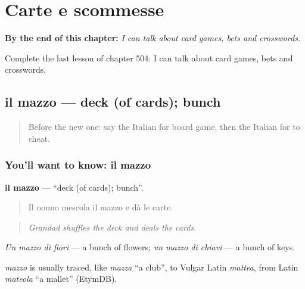 
\chapter{Carte e scommesse}
\label{ch:it-carte-e-scommesse}

\begin{chapteropening}
\textbf{By the end of this chapter:} \emph{I can talk about card games, bets and crosswords.}

Complete the last lesson of chapter 504: I can talk about card games, bets and crosswords.
\end{chapteropening}

\section[il mazzo]{il mazzo — deck (of cards); bunch}

\label{lesson:IT-C504-mazzo}



\begin{quote}
Before the new one: say the Italian for board game, then the Italian for to cheat.
\end{quote}

\subsection*{You'll want to know: il mazzo}
\textbf{il mazzo} — \textquotedblleft{}deck (of cards); bunch\textquotedblright{}.

\begin{quote}
Il nonno mescola il mazzo e dà le carte.
\end{quote}

\begin{quote}
\emph{Grandad shuffles the deck and deals the cards.}
\end{quote}

\emph{Un mazzo di fiori} — a bunch of flowers; \emph{un mazzo di chiavi} — a bunch of keys.

\begin{cousinweb}
\emph{mazzo} is usually traced, like \emph{mazza} \textquotedblleft{}a club\textquotedblright{}, to Vulgar Latin \emph{mattea}, from Latin \emph{mateola} \textquotedblleft{}a mallet\textquotedblright{} (EtymDB).
\end{cousinweb}

